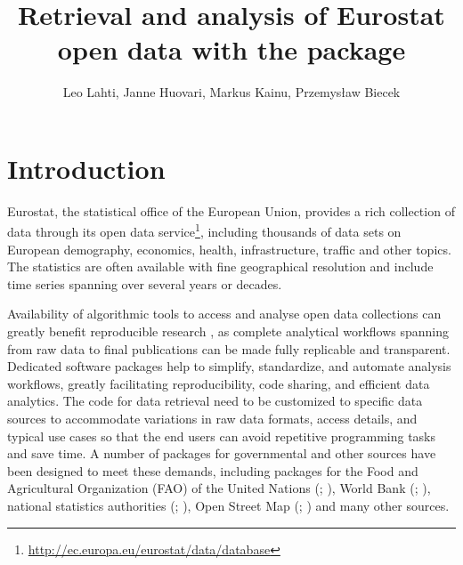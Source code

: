 \title{Retrieval and analysis of Eurostat open data with the  package}
\author{Leo Lahti, Janne Huovari, Markus Kainu, Przemys{\l}aw Biecek}

\maketitle



\section{Introduction}

Eurostat, the statistical office of the European Union, provides a
rich collection of data through its open data
service\footnote{\url{http://ec.europa.eu/eurostat/data/database}},
including thousands of data sets on European demography, economics,
health, infrastructure, traffic and other topics. The statistics are
often available with fine geographical resolution and include time
series spanning over several years or decades.

Availability of algorithmic tools to access and analyse open data
collections can greatly benefit reproducible
research \citep{Gandrud13, Boettiger2015}, as complete analytical
workflows spanning from raw data to final publications can be made
fully replicable and transparent. Dedicated software packages help to
simplify, standardize, and automate analysis workflows, greatly
facilitating reproducibility, code sharing, and efficient data
analytics. The code for data retrieval need to be customized to specific data
sources to accommodate variations in raw data formats, access details,
and typical use cases so that the end users can avoid repetitive
programming tasks and save time. A number of packages for governmental
and other sources have been designed to meet these demands, including
packages for the Food and Agricultural Organization (FAO) of the
United Nations (; \citealt{FAOSTAT}), World Bank
(; \citealt{WDI}), national statistics authorities
(; \citealt{pxweb}), Open Street Map
(; \citealt{osmar}) and many other sources.

